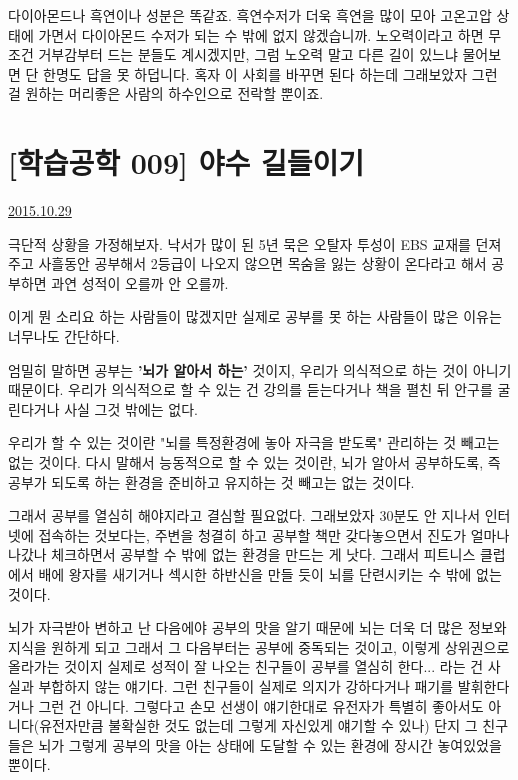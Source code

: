 다이아몬드나 흑연이나 성분은 똑같죠.
흑연수저가 더욱 흑연을 많이 모아 고온고압 상태에 가면서 다이아몬드 수저가 되는 수 밖에 없지 않겠습니까.
노오력이라고 하면 무조건 거부감부터 드는 분들도 계시겠지만,
그럼 노오력 말고 다른 길이 있느냐 물어보면 단 한명도 답을 못 하덥니다.
혹자 이 사회를 바꾸면 된다 하는데 그래보았자 그런 걸 원하는 머리좋은 사람의 하수인으로 전락할 뿐이죠.
\vspace{5mm}






\section{[학습공학 009] 야수 길들이기}
\href{https://www.kockoc.com/Apoc/450912}{2015.10.29}

\vspace{5mm}

극단적 상황을 가정해보자.
낙서가 많이 된 5년 묵은 오탈자 투성이 EBS 교재를 던져주고
사흘동안 공부해서 2등급이 나오지 않으면 목숨을 잃는 상황이 온다라고 해서 공부하면
과연 성적이 오를까 안 오를까.
\vspace{5mm}

이게 뭔 소리요 하는 사람들이 많겠지만
실제로 공부를 못 하는 사람들이 많은 이유는 너무나도 간단하다.
\vspace{5mm}

엄밀히 말하면 공부는 \textbf{'뇌가 알아서 하는'} 것이지, 우리가 의식적으로 하는 것이 아니기 때문이다.
우리가 의식적으로 할 수 있는 건
강의를 듣는다거나
책을 펼친 뒤 안구를 굴린다거나
사실 그것 밖에는 없다.
\vspace{5mm}

우리가 할 수 있는 것이란 "뇌를 특정환경에 놓아 자극을 받도록" 관리하는 것 빼고는 없는 것이다.
다시 말해서 능동적으로 할 수 있는 것이란, 뇌가 알아서 공부하도록,
즉 공부가 되도록 하는 환경을 준비하고 유지하는 것 빼고는 없는 것이다.
\vspace{5mm}

그래서 공부를 열심히 해야지라고 결심할 필요없다.
그래보았자 30분도 안 지나서 인터넷에 접속하는 것보다는,
주변을 청결히 하고 공부할 책만 갖다놓으면서 진도가 얼마나 나갔나 체크하면서 공부할 수 밖에 없는 환경을 만드는 게 낫다.
그래서 피트니스 클럽에서 배에 왕자를 새기거나 섹시한 하반신을 만들 듯이
뇌를 단련시키는 수 밖에 없는 것이다.
\vspace{5mm}

뇌가 자극받아 변하고 난 다음에야 공부의 맛을 알기 때문에 뇌는 더욱 더 많은 정보와 지식을 원하게 되고
그래서 그 다음부터는 공부에 중독되는 것이고, 이렇게 상위권으로 올라가는 것이지
실제로 성적이 잘 나오는 친구들이 공부를 열심히 한다... 라는 건 사실과 부합하지 않는 얘기다.
그런 친구들이 실제로 의지가 강하다거나 패기를 발휘한다거나 그런 건 아니다.
그렇다고 손모 선생이 얘기한대로 유전자가 특별히 좋아서도 아니다(유전자만큼 불확실한 것도 없는데 그렇게 자신있게 얘기할 수 있나)
단지 그 친구들은 뇌가 그렇게 공부의 맛을 아는 상태에 도달할 수 있는 환경에 장시간 놓여있었을 뿐이다.
\vspace{5mm}

